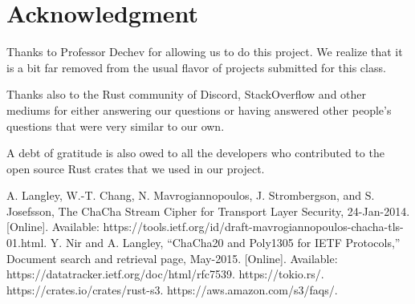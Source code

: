 \documentclass[conference]{IEEEtran}
\begin{document}
\section*{Acknowledgment}

Thanks to Professor Dechev for allowing us to do this project.
We realize that it is a bit far removed from the usual flavor
of projects submitted for this class.

Thanks also to the Rust community of Discord, StackOverflow
and other mediums for either answering our questions or having
answered other people's questions that were very similar to our own.

A debt of gratitude is also owed to all the developers who contributed
to the open source Rust crates that we used in our project.


\begin{thebibliography}{00}
 A. Langley, W.-T. Chang, N. Mavrogiannopoulos, J. Strombergson, and S. Josefsson, The ChaCha Stream Cipher for Transport Layer Security, 24-Jan-2014. [Online]. Available: https://tools.ietf.org/id/draft-mavrogiannopoulos-chacha-tls-01.html.
 Y. Nir and A. Langley, “ChaCha20 and Poly1305 for IETF Protocols,” Document search and retrieval page, May-2015. [Online]. Available: https://datatracker.ietf.org/doc/html/rfc7539.
 https://tokio.rs/.
 https://crates.io/crates/rust-s3.
 https://aws.amazon.com/s3/faqs/.

\end{thebibliography}
\vspace{12pt}
\end{document}
